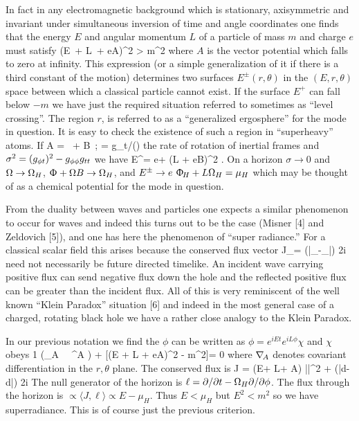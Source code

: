 In fact in any electromagnetic background which is stationary, axisymmetric and
invariant under simultaneous inversion of time and angle coordinates one finds that the
energy $E$ and angular momentum $L$ of a particle of mass $m$ and charge $e$ must satisfy
\be
(E\, \dt + L\, \dphi + eA)^2 > m^2
\ee
where $A$ is the vector potential which falls to zero at infinity.
This expression (or a simple generalization of it if there is a third constant of the motion)
determines two surfaces $E^{\pm} (r,\theta)$ in the $(E, r, \theta)$ space between which
a classical particle cannot exist. If the surface $E^+$ can fall below $- m$ we have just the
required situation referred to sometimes as ``level crossing''. The region $r$,
is referred to as a ``generalized ergosphere'' for the mode in question.
It is easy to check the existence of such a region in ``superheavy'' atoms. If
\be
A = \Phi\, \dt + B\, \dphi; \quad \Omega = g_{\phi t}/(\gtt)
\ee
the rate of rotation of inertial frames and $\sigma^2 = (g_{\phi t})^2 - g_{\phi\phi}g_{tt}$ we have
\be
E^\pm = e\mathop\Phi + (L + eB)\Omega \pm \sigma^2  .
\ee
\ni
On a horizon $\sigma\rightarrow 0$ and $\Omega \rightarrow \Omega_H$, $\Upphi + \Omega B \rightarrow \Omega_H$, and
$E^\pm \rightarrow e \mathop{}\Upphi_{\!H} + L \Omega_H = \mu_H$
which may be thought of as a chemical potential for the mode in question.

From the duality between waves and particles one expects a similar
phenomenon to occur for waves and indeed this turns out to be the case
(Misner [4] and Zeldovich [5]), and one has here the phenomenon of
``super radiance.'' For a classical scalar ﬁeld this arises because
the conserved flux vector
\be
J_\mu = {(\bar\phi\grad_{\!\mu}\phi-\phi\grad_{\!\mu}\bar\phi) \over 2i}
\ee
need not necessarily be future directed timelike. An incident wave carrying positive flux can send negative flux down the hole and the reflected positive flux can be greater than the incident flux. All of this is very reminiscent of the well known ``Klein Paradox'' situation [6] and indeed in the most general case of a charged, rotating black hole we have a rather close analogy to the Klein Paradox. 

In our previous notation we find the $\phi$ can be written as $\phi = e^{iEt}e^{iL\phi}\chi$ and $\chi$ obeys
\be
{1 \over \sigma}(\grad_A \, \sigma \, \grad^A \chi) + {[(E \dt + L \dphi + eA)^2 - m^2]}\chi = 0
\ee
where $\grad_A$ denotes covariant differentiation in the $r, \theta$ plane. The conserved flux is
\be
J = (E\dt + L\dphi + A) |\chi|^2 + {(\bar\chi d\chi - \chi d\bar\chi) \over 2i}
\ee
The null generator of the horizon is $\ell = \partial / \partial t - \Omega_H \partial/\partial\phi$.
The flux through the horizon is $\propto \langle J, \ell \rangle \propto E - \mu_H$. Thus $E < \mu_H$
but $E^2 < m^2$ so we have superradiance. This is of course just the previous criterion.

